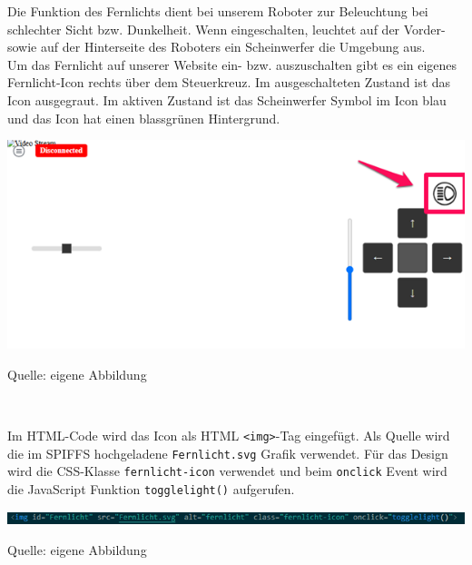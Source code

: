 \documentclass[ngerman,12pt,a4paper]{article}
\begin{document}
	Die Funktion des Fernlichts dient bei unserem Roboter zur Beleuchtung bei schlechter Sicht bzw. Dunkelheit. Wenn eingeschalten, leuchtet auf der Vorder- sowie auf der Hinterseite des Roboters ein Scheinwerfer die Umgebung aus. \\[0.5cm]
	Um das Fernlicht auf unserer Website ein- bzw. auszuschalten gibt es ein eigenes Fernlicht-Icon rechts über dem Steuerkreuz. Im ausgeschalteten Zustand ist das Icon ausgegraut. Im aktiven Zustand ist das Scheinwerfer Symbol im Icon blau und das Icon hat einen blassgrünen Hintergrund. \\[0.5cm]
	\begin{center}
		\begin{minipage}[t]{1\textwidth}
			\includegraphics[scale=0.9]{Pictures/fernlicht-web}
			\label{fig:fernlicht-web}
			\vspace{-10pt}
			\begin{center}
				\par\small Quelle: eigene Abbildung 
			\end{center}
		\end{minipage} \\[0.75cm]
	\end{center}
	Im HTML-Code wird das Icon als HTML \texttt{<img>}-Tag eingefügt. Als Quelle wird die im SPIFFS hochgeladene \texttt{Fernlicht.svg} Grafik verwendet. Für das Design wird die CSS-Klasse \texttt{fernlicht-icon} verwendet und beim \texttt{onclick} Event wird die JavaScript Funktion \texttt{togglelight()} aufgerufen. \\
	\begin{center}
		\begin{minipage}[t]{1\textwidth}
			\includegraphics[scale=0.9]{Pictures/fernlicht-html}
			\label{fig:fernlicht-html}
			\vspace{-10pt}
			\begin{center}
				\par\small Quelle: eigene Abbildung 
			\end{center}
		\end{minipage} \\[0.75cm]
	\end{center}
\end{document}
